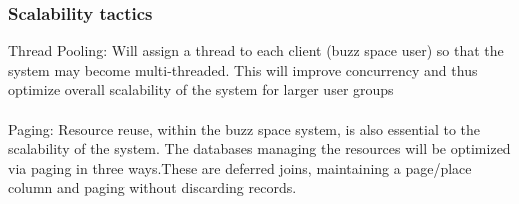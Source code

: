 \subsubsection{Scalability tactics}
Thread Pooling: Will assign a thread to each client (buzz space user) so that the system may become multi-threaded. This will improve concurrency and thus optimize overall scalability of the system for larger user groups\\
\\  
Paging: Resource reuse, within the buzz space system, is also essential to the scalability of the system. The databases managing the resources will be optimized via paging in three ways.These are deferred joins, maintaining a page/place column and paging without discarding records.       